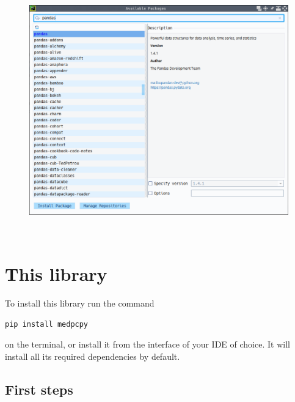\documentclass[a4paper,12pt]{article}
\begin{document}
\begin{figure}[!ht]
    \begin{center}
        \includegraphics[scale=0.4]{pycharm-library-install.png}
    \end{center}
\end{figure}

\newpage
\ 
\newpage
\section{This library}

To install this library run the command

\begin{tcolorbox}[
    enhanced,
    attach boxed title to top left={xshift=6mm,yshift=-3mm},
    colback=lightgreen!20,
    colframe=lightgreen,
    sharp corners,
    ]
    \begin{verbatim}
pip install medpcpy
    \end{verbatim}
\end{tcolorbox}

\noindent on the terminal, or install it from the interface of your IDE of choice. It will install all its required dependencies by default.

\subsection{First steps}
\end{document}
